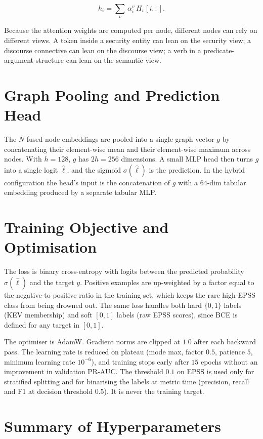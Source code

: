 \documentclass[11pt]{article}
\begin{document}
\[
h_i = \sum_{v}\, \alpha_i^{v}\, H_v[i, :].
\]

Because the attention weights are computed per node, different nodes
can rely on different views. A token inside a security entity can lean
on the security view; a discourse connective can lean on the discourse
view; a verb in a predicate-argument structure can lean on the
semantic view.

\section{Graph Pooling and Prediction Head}

The $N$ fused node embeddings are pooled into a single graph vector
$g$ by concatenating their element-wise mean and their element-wise
maximum across nodes. With $h = 128$, $g$ has $2h = 256$ dimensions.
A small MLP head then turns $g$ into a single logit $\hat{\ell}$, and
the sigmoid $\sigma(\hat{\ell})$ is the prediction. In the hybrid
configuration the head's input is the concatenation of $g$ with a
$64$-dim tabular embedding produced by a separate tabular MLP.

\section{Training Objective and Optimisation}

The loss is binary cross-entropy with logits between the predicted
probability $\sigma(\hat{\ell})$ and the target $y$. Positive examples
are up-weighted by a factor equal to the negative-to-positive ratio in
the training set, which keeps the rare high-EPSS class from being
drowned out. The same loss handles both hard $\{0, 1\}$ labels (KEV
membership) and soft $[0, 1]$ labels (raw EPSS scores), since BCE is
defined for any target in $[0, 1]$.

The optimiser is AdamW. Gradient norms are clipped at $1.0$ after
each backward pass. The learning rate is reduced on plateau (mode
max, factor $0.5$, patience $5$, minimum learning rate $10^{-6}$),
and training stops early after $15$ epochs without an improvement in
validation PR-AUC. The threshold $0.1$ on EPSS is used only for
stratified splitting and for binarising the labels at metric time
(precision, recall and F1 at decision threshold $0.5$). It is never
the training target.

\section{Summary of Hyperparameters}
\end{document}
